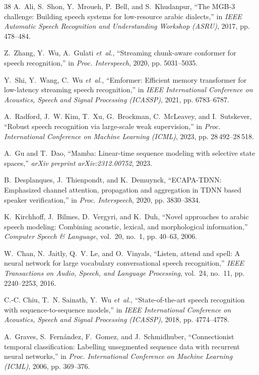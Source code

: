 \documentclass[journal]{IEEEtran}
\begin{document}
\begin{thebibliography}{38}
A.~Ali, S.~Shon, Y.~Mroueh, P.~Bell, and S.~Khudanpur, ``The {MGB-3} challenge:
  Building speech systems for low-resource arabic dialects,'' in \emph{IEEE
  Automatic Speech Recognition and Understanding Workshop (ASRU)}, 2017, pp.
  478--484.

Z.~Zhang, Y.~Wu, A.~Gulati \emph{et~al.}, ``Streaming chunk-aware conformer for
  speech recognition,'' in \emph{Proc. Interspeech}, 2020, pp. 5031--5035.

Y.~Shi, Y.~Wang, C.~Wu \emph{et~al.}, ``Emformer: Efficient memory transformer
  for low-latency streaming speech recognition,'' in \emph{IEEE International
  Conference on Acoustics, Speech and Signal Processing (ICASSP)}, 2021, pp.
  6783--6787.

A.~Radford, J.~W. Kim, T.~Xu, G.~Brockman, C.~McLeavey, and I.~Sutskever,
  ``Robust speech recognition via large-scale weak supervision,'' in
  \emph{Proc. International Conference on Machine Learning (ICML)}, 2023, pp.
  28\,492--28\,518.

A.~Gu and T.~Dao, ``Mamba: Linear-time sequence modeling with selective state
  spaces,'' \emph{arXiv preprint arXiv:2312.00752}, 2023.

B.~Desplanques, J.~Thienpondt, and K.~Demuynck, ``{ECAPA-TDNN}: Emphasized
  channel attention, propagation and aggregation in {TDNN} based speaker
  verification,'' in \emph{Proc. Interspeech}, 2020, pp. 3830--3834.

K.~Kirchhoff, J.~Bilmes, D.~Vergyri, and K.~Duh, ``Novel approaches to arabic
  speech modeling: Combining acoustic, lexical, and morphological
  information,'' \emph{Computer Speech \& Language}, vol.~20, no.~1, pp.
  40--63, 2006.

W.~Chan, N.~Jaitly, Q.~V. Le, and O.~Vinyals, ``Listen, attend and spell: A
  neural network for large vocabulary conversational speech recognition,''
  \emph{IEEE Transactions on Audio, Speech, and Language Processing}, vol.~24,
  no.~11, pp. 2240--2253, 2016.

C.-C. Chiu, T.~N. Sainath, Y.~Wu \emph{et~al.}, ``State-of-the-art speech
  recognition with sequence-to-sequence models,'' in \emph{IEEE International
  Conference on Acoustics, Speech and Signal Processing (ICASSP)}, 2018, pp.
  4774--4778.

A.~Graves, S.~Fern{\'a}ndez, F.~Gomez, and J.~Schmidhuber, ``Connectionist
  temporal classification: Labelling unsegmented sequence data with recurrent
  neural networks,'' in \emph{Proc. International Conference on Machine
  Learning (ICML)}, 2006, pp. 369--376.


\end{thebibliography}
\end{document}
